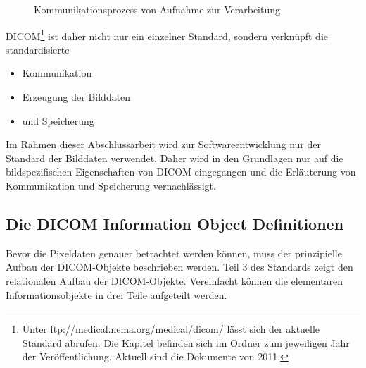 \begin{figure}[htbp]
  \vspace{0.5cm}
  \centering
  \caption{Kommunikationsprozess von Aufnahme zur Verarbeitung \cite[S. 19]{pianykh:dicom}}
  \label{communication}
  \vspace{0.5cm}
\end{figure}

\pagebreak
DICOM\footnote{Unter ftp://medical.nema.org/medical/dicom/ lässt sich der aktuelle Standard abrufen. Die Kapitel befinden sich im Ordner zum jeweiligen Jahr der Veröffentlichung. Aktuell sind die Dokumente von 2011.} ist daher nicht nur ein einzelner Standard, sondern verknüpft die standardisierte 
\begin{itemize}
\item Kommunikation
\item Erzeugung der Bilddaten
\item und Speicherung
\end{itemize}
Im Rahmen dieser Abschlussarbeit wird zur Softwareentwicklung nur der Standard der Bilddaten verwendet. Daher wird in den Grundlagen nur auf die bildspezifischen Eigenschaften von DICOM eingegangen und die Erläuterung von Kommunikation und Speicherung vernachlässigt.

\FloatBarrier
\subsection{Die DICOM Information Object Definitionen} \label{grundlagen:iod}
Bevor die Pixeldaten genauer betrachtet werden können, muss der prinzipielle Aufbau der DICOM-Objekte beschrieben werden. Teil 3 des Standards\cite[A.1.2]{dicom:iod} zeigt den relationalen Aufbau der DICOM-Objekte. Vereinfacht können die elementaren Informationsobjekte in drei Teile aufgeteilt werden.

